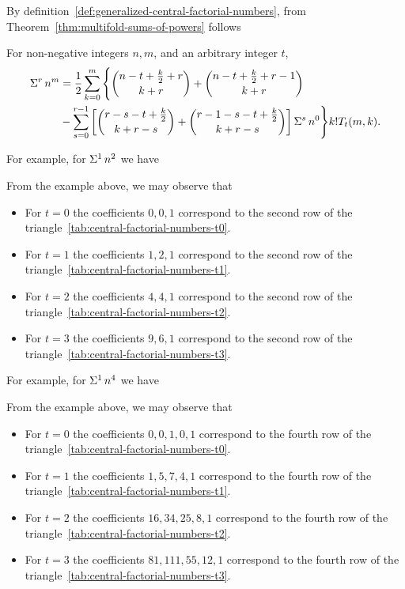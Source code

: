 By definition~\eqref{def:generalized-central-factorial-numbers},
from Theorem~\eqref{thm:multifold-sums-of-powers} follows
\begin{proposition}
  \label{prop:multifold-central-factorial-sums-of-powers}
  For non-negative integers $n,m$, and an arbitrary integer $t$,
  \begin{align*}
    \Sigma^{r}\,{n}^{m}
    &= \frac{1}{2} \sum_{k=0}^{m}
    \Bigg \{
      \binom{n-t+\frac{k}{2}+r}{k+r} + \binom{n-t+\frac{k}{2}+r-1}{k+r} \\
      &-
      \sum_{s=0}^{r-1}
      \left[
        \binom{r-s-t+\frac{k}{2}}{k+r-s} + \binom{r-1-s-t+\frac{k}{2}}{k+r-s}
      \right] \Sigma^{s}\,{n}^{0}
    \Bigg \} k! T_t(m,k).
  \end{align*}
\end{proposition}
For example, for $\Sigma^{1}\,{n}^{2}$ we have

From the example above, we may observe that
\begin{itemize}
  \item For $t=0$ the coefficients $0,0,1$ correspond to the second row of the triangle~\eqref{tab:central-factorial-numbers-t0}.
  \item For $t=1$ the coefficients $1,2,1$ correspond to the second row of the triangle~\eqref{tab:central-factorial-numbers-t1}.
  \item For $t=2$ the coefficients $4,4,1$ correspond to the second row of the triangle~\eqref{tab:central-factorial-numbers-t2}.
  \item For $t=3$ the coefficients $9,6,1$ correspond to the second row of the triangle~\eqref{tab:central-factorial-numbers-t3}.
\end{itemize}
For example, for $\Sigma^{1}\,{n}^{4}$ we have

From the example above, we may observe that
\begin{itemize}
  \item For $t=0$ the coefficients $0,0,1,0,1$ correspond to the fourth row of the triangle~\eqref{tab:central-factorial-numbers-t0}.
  \item For $t=1$ the coefficients $1,5,7,4,1$ correspond to the fourth row of the triangle~\eqref{tab:central-factorial-numbers-t1}.
  \item For $t=2$ the coefficients $16,34,25,8,1$ correspond to the fourth row of the triangle~\eqref{tab:central-factorial-numbers-t2}.
  \item For $t=3$ the coefficients $81,111,55,12,1$ correspond to the fourth row of the triangle~\eqref{tab:central-factorial-numbers-t3}.
\end{itemize}
